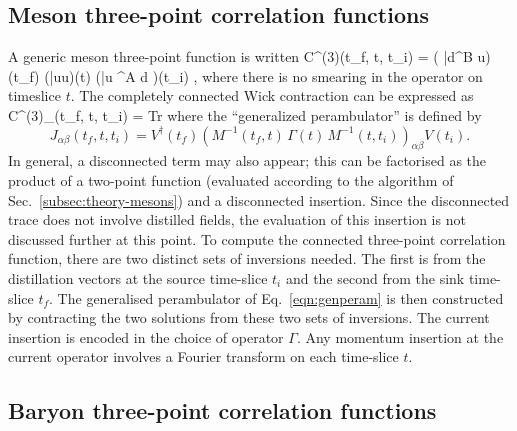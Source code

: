 \subsection{Meson three-point correlation functions}\label{subsec:theory-mesons-3pt}

A generic meson three-point function is written
\beq
   C^{(3)}(t_f, t, t_i) = \Big\langle
\big( \bar{d}\Box \Gamma^B \Box u\big)(t_f) \cdot
\big(\bar{u}\Gamma u\big)(t) \cdot
\big(\bar{u} \Box \Gamma^A \Box d \big)(t_i)
\Big\rangle,
\eeq
where there is no smearing in the operator on timeslice $t$.
The completely connected Wick contraction can be expressed as
\beq
 C^{(3)}_{}(t_f, t, t_i) = \mbox{Tr}
\eeq
where the ``generalized perambulator'' is defined by
\begin{equation}
J_{\alpha\beta}(t_f,t,t_i) =  V^\dag(t_f) \left( M^{-1}(t_f,t)\, \Gamma(t) \,
M^{-1}(t,t_i)  \right)_{\alpha\beta} V(t_i). \label{eqn:genperam}
\end{equation}
In general, a disconnected term may also appear; this can be factorised as the
product of a two-point function (evaluated according to the algorithm of
Sec.~\ref{subsec:theory-mesons}) and a disconnected insertion. Since the
disconnected trace does not involve distilled fields, the evaluation of this
insertion is not discussed further at this point.
To compute the connected three-point correlation function, there are two
distinct sets of inversions needed. The first is from the distillation vectors
at the source time-slice $t_i$ and the second from the sink time-slice $t_f$.
The generalised perambulator of Eq.~\ref{eqn:genperam} is then constructed by
contracting the two solutions from these two sets of inversions.
The current insertion is encoded in the choice of operator $\Gamma$.
Any momentum insertion at the current operator involves a Fourier transform on
each time-slice $t$.

\subsection{Baryon three-point correlation functions}\label{subsec:theory-baryons-3pt}

